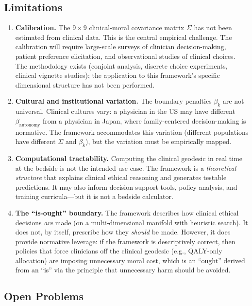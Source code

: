 \documentclass[12pt]{article}
\theoremstyle{definition}
\theoremstyle{remark}
\begin{document}
\subsection{Limitations}

\begin{enumerate}
    \item \textbf{Calibration.}  The $9 \times 9$ clinical-moral covariance matrix $\Sigma$ has not been estimated from clinical data.  This is the central empirical challenge.  The calibration will require large-scale surveys of clinician decision-making, patient preference elicitation, and observational studies of clinical choices.  The methodology exists (conjoint analysis, discrete choice experiments, clinical vignette studies); the application to this framework's specific dimensional structure has not been performed.

    \item \textbf{Cultural and institutional variation.}  The boundary penalties $\beta_k$ are not universal.  Clinical cultures vary: a physician in the US may have different $\beta_{\text{autonomy}}$ from a physician in Japan, where family-centered decision-making is normative.  The framework accommodates this variation (different populations have different $\Sigma$ and $\beta_k$), but the variation must be empirically mapped.

    \item \textbf{Computational tractability.}  Computing the clinical geodesic in real time at the bedside is not the intended use case.  The framework is a \emph{theoretical structure} that explains clinical ethical reasoning and generates testable predictions.  It may also inform decision support tools, policy analysis, and training curricula---but it is not a bedside calculator.

    \item \textbf{The ``is-ought'' boundary.}  The framework describes how clinical ethical decisions \emph{are} made (on a multi-dimensional manifold with heuristic search).  It does not, by itself, prescribe how they \emph{should} be made.  However, it does provide normative leverage: if the framework is descriptively correct, then policies that force clinicians off the clinical geodesic (e.g., QALY-only allocation) are imposing unnecessary moral cost, which is an ``ought'' derived from an ``is'' via the principle that unnecessary harm should be avoided.
\end{enumerate}

\subsection{Open Problems}
\end{document}
